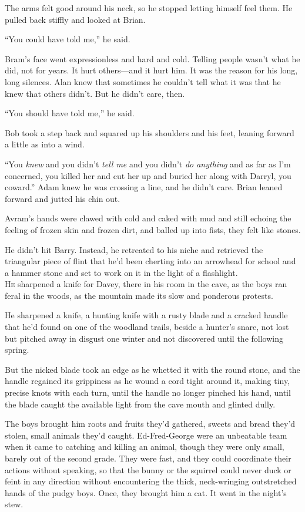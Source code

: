 \documentclass{article}
\begin{document}
The arms felt good around his neck, so he stopped letting himself feel
them.  He pulled back stiffly and looked at Brian.

``You could have told me,'' he said.

Bram's face went expressionless and hard and cold.  Telling people
wasn't what he did, not for years.  It hurt others---and it hurt him. 
It was the reason for his long, long silences.  Alan knew that
sometimes he couldn't tell what it was that he knew that others
didn't.  But he didn't care, then.

``You should have told me,'' he said.

Bob took a step back and squared up his shoulders and his feet,
leaning forward a little as into a wind.

``You \textit{knew} and you didn't \textit{tell me} and you didn't
\textit{do anything} and as far as I'm concerned, you killed her and
cut her up and buried her along with Darryl, you coward.'' Adam knew
he was crossing a line, and he didn't care.  Brian leaned forward and
jutted his chin out.

Avram's hands were clawed with cold and caked with mud and still
echoing the feeling of frozen skin and frozen dirt, and balled up into
fists, they felt like stones.

He didn't hit Barry.  Instead, he retreated to his niche and retrieved
the triangular piece of flint that he'd been cherting into an
arrowhead for school and a hammer stone and set to work on it in the
light of a flashlight.
\\
\lettrine[lines=3, lhang=.5, nindent=0pt, findent=2pt]{H}{e} sharpened a knife for Davey, there in his room in the cave, as the
boys ran feral in the woods, as the mountain made its slow and
ponderous protests.

He sharpened a knife, a hunting knife with a rusty blade and a cracked
handle that he'd found on one of the woodland trails, beside a
hunter's snare, not lost but pitched away in disgust one winter and
not discovered until the following spring.

But the nicked blade took an edge as he whetted it with the round
stone, and the handle regained its grippiness as he wound a cord tight
around it, making tiny, precise knots with each turn, until the handle
no longer pinched his hand, until the blade caught the available light
from the cave mouth and glinted dully.

The boys brought him roots and fruits they'd gathered, sweets and
bread they'd stolen, small animals they'd caught.  Ed-Fred-George were
an unbeatable team when it came to catching and killing an animal,
though they were only small, barely out of the second grade.  They
were fast, and they could coordinate their actions without speaking,
so that the bunny or the squirrel could never duck or feint in any
direction without encountering the thick, neck-wringing outstretched
hands of the pudgy boys.  Once, they brought him a cat.  It went in
the night's stew.
\end{document}
